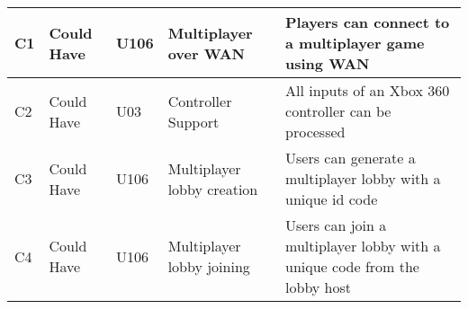 \documentclass{article} %
\begin{document}
\begin{longtable}{|p{}|p{}|p{}|p{}|p{}|}
    C1 & Could Have & U106 & Multiplayer over WAN & Players can connect to a multiplayer game using WAN \\ \hline
    C2 & Could Have & U03 & Controller Support & All inputs of an Xbox 360 controller can be processed \\ \hline
    C3 & Could Have & U106 & Multiplayer lobby creation & Users can generate a multiplayer lobby with a unique id code \\ \hline
    C4 & Could Have & U106 & Multiplayer lobby joining & Users can join a multiplayer lobby with a unique code from the lobby host \\ \hline
    

\end{longtable}
\newpage
\end{document}
